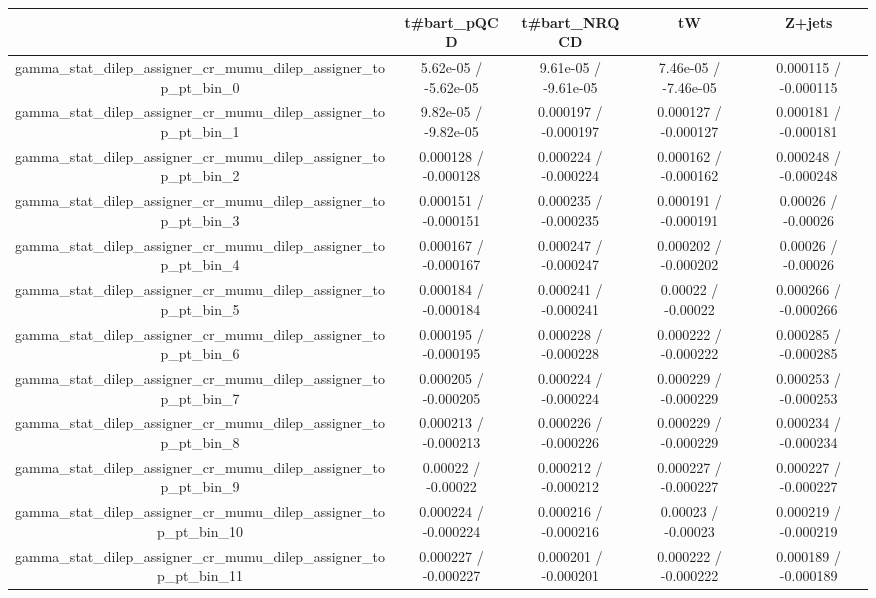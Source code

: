 \documentclass[10pt]{article}
\begin{document}
\begin{table}[htbp]
\begin{center}
\begin{tabular}{|c|c|c|c|c|}
\hline 
      & t#bar{t}_{pQCD}      & t#bar{t}_{NRQCD}      & tW      & Z+jets \\ 
\hline 
  gamma_stat_dilep_assigner_cr_mumu_dilep_assigner_top_pt_bin_0 & 5.62e-05 / -5.62e-05 & 9.61e-05 / -9.61e-05 & 7.46e-05 / -7.46e-05 & 0.000115 / -0.000115 \\ 
  gamma_stat_dilep_assigner_cr_mumu_dilep_assigner_top_pt_bin_1 & 9.82e-05 / -9.82e-05 & 0.000197 / -0.000197 & 0.000127 / -0.000127 & 0.000181 / -0.000181 \\ 
  gamma_stat_dilep_assigner_cr_mumu_dilep_assigner_top_pt_bin_2 & 0.000128 / -0.000128 & 0.000224 / -0.000224 & 0.000162 / -0.000162 & 0.000248 / -0.000248 \\ 
  gamma_stat_dilep_assigner_cr_mumu_dilep_assigner_top_pt_bin_3 & 0.000151 / -0.000151 & 0.000235 / -0.000235 & 0.000191 / -0.000191 & 0.00026 / -0.00026 \\ 
  gamma_stat_dilep_assigner_cr_mumu_dilep_assigner_top_pt_bin_4 & 0.000167 / -0.000167 & 0.000247 / -0.000247 & 0.000202 / -0.000202 & 0.00026 / -0.00026 \\ 
  gamma_stat_dilep_assigner_cr_mumu_dilep_assigner_top_pt_bin_5 & 0.000184 / -0.000184 & 0.000241 / -0.000241 & 0.00022 / -0.00022 & 0.000266 / -0.000266 \\ 
  gamma_stat_dilep_assigner_cr_mumu_dilep_assigner_top_pt_bin_6 & 0.000195 / -0.000195 & 0.000228 / -0.000228 & 0.000222 / -0.000222 & 0.000285 / -0.000285 \\ 
  gamma_stat_dilep_assigner_cr_mumu_dilep_assigner_top_pt_bin_7 & 0.000205 / -0.000205 & 0.000224 / -0.000224 & 0.000229 / -0.000229 & 0.000253 / -0.000253 \\ 
  gamma_stat_dilep_assigner_cr_mumu_dilep_assigner_top_pt_bin_8 & 0.000213 / -0.000213 & 0.000226 / -0.000226 & 0.000229 / -0.000229 & 0.000234 / -0.000234 \\ 
  gamma_stat_dilep_assigner_cr_mumu_dilep_assigner_top_pt_bin_9 & 0.00022 / -0.00022 & 0.000212 / -0.000212 & 0.000227 / -0.000227 & 0.000227 / -0.000227 \\ 
  gamma_stat_dilep_assigner_cr_mumu_dilep_assigner_top_pt_bin_10 & 0.000224 / -0.000224 & 0.000216 / -0.000216 & 0.00023 / -0.00023 & 0.000219 / -0.000219 \\ 
  gamma_stat_dilep_assigner_cr_mumu_dilep_assigner_top_pt_bin_11 & 0.000227 / -0.000227 & 0.000201 / -0.000201 & 0.000222 / -0.000222 & 0.000189 / -0.000189 \\ 

\end{tabular}
\end{center}
\end{table}
\end{document}
